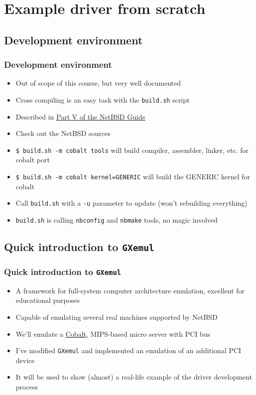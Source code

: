 \documentclass[dvipsnames,table]{beamer}
\begin{document}
\section{Example driver from scratch}

\subsection{Development environment}

\begin{frame}
\frametitle{Development environment}
\begin{itemize}
	\item Out of scope of this course, but very well documented
	\item Cross compiling is an easy task with the {\tt build.sh} script
	\item Described in \href{http://www.netbsd.org/docs/guide/en/part-compile.html}{Part V of the NetBSD Guide}
	\item Check out the NetBSD sources
	\item {\tt \$ build.sh -m cobalt tools} will build compiler, assembler, linker, etc. for cobalt port
	\item {\tt \$ build.sh -m cobalt kernel=GENERIC} will build the GENERIC kernel for cobalt
	\item Call {\tt build.sh} with a {\tt -u} parameter to update (won't rebuilding everything)
	\item {\tt build.sh} is calling {\tt nbconfig} and {\tt nbmake} tools, no magic involved
\end{itemize}
\end{frame}

\subsection{Quick introduction to {\tt GXemul}}

\begin{frame}
\frametitle{Quick introduction to {\tt GXemul}}
\begin{itemize}
	\item A framework for full-system computer architecture emulation, excellent for educational purposes
	\item Capable of emulating several real machines supported by NetBSD
	\item We'll emulate a \href{http://en.wikipedia.org/wiki/Cobalt_Qube}{Cobalt}, MIPS-based micro server with PCI bus
	\item I've modified {\tt GXemul} and implemented an emulation of an additional PCI device
	\item It will be used to show (almost) a real-life example of the driver development process
\end{itemize}
\end{frame}
\end{document}
